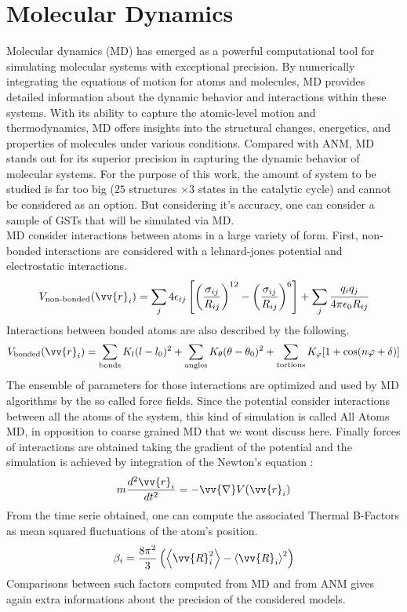 \section{Molecular Dynamics}
Molecular dynamics (MD) has emerged as a powerful computational tool for simulating molecular systems with exceptional precision. By numerically integrating the equations of motion for atoms and molecules, MD provides detailed information about the dynamic behavior and interactions within these systems. With its ability to capture the atomic-level motion and thermodynamics, MD offers insights into the structural changes, energetics, and properties of molecules under various conditions. Compared with ANM, MD stands out for its superior precision in capturing the dynamic behavior of molecular systems. For the purpose of this work, the amount of system to be studied is far too big ($25$ structures $\times 3$ states in the catalytic cycle) and cannot be considered as an option. But considering it's accuracy, one can consider a sample of GSTs that will be simulated via MD.\\
MD consider interactions between atoms in a large variety of form. First, non-bonded interactions are considered with a lehnard-jones potential and electrostatic interactions.
\begin{equation}
	\label{non-bonded}
	V_{\text{non-bonded}}(\vv{r}_i) = \sum_j 4\epsilon_{ij}\left[ \left( \frac{\sigma_{ij}}{R_{ij}} \right)^{12} - \left( \frac{\sigma_{ij}}{R_{ij}} \right)^{6} \right] + \sum_j\cfrac{q_iq_j}{4\pi\epsilon_0R_{ij}}
\end{equation}
Interactions between bonded atoms are also described by the following.
\begin{equation}
	\label{bonded}
	V_{\text{bonded}}(\vv{r}_i) = \sum_{\text{bonds}} K_l(l - l_0)^2 + \sum_{\text{angles}} K_\theta(\theta - \theta_0)^2 + \sum_{\text{tortions}} K_\varphi [1 + \cos (n\varphi + \delta)]
\end{equation}
The ensemble of parameters for those interactions are optimized and used by MD algorithms by the so called force fields. Since the potential consider interactions between all the atoms of the system, this kind of simulation is called All Atoms MD, in opposition to coarse grained MD that we wont discuss here. Finally forces of interactions are obtained taking the gradient of the potential and the simulation is achieved by integration of the Newton's equation :
\begin{equation}
	\label{Newton}
	m\frac{d^2\vv{r}_i}{dt^2} = -\vv{\nabla}V(\vv{r}_i)
\end{equation}
From the time serie obtained, one can compute the associated Thermal B-Factors as mean squared fluctuations of the atom's position.
\begin{equation}
	\label{MD thermal B-factors}
	\beta_i = \frac{8\pi^2}{3}\left(\left< \vv{R}_i^2 \right> - \left< \vv{R}_i \right>^2\right)
\end{equation}
Comparisons between such factors computed from MD and from ANM gives again extra informations about the precision of the considered models.